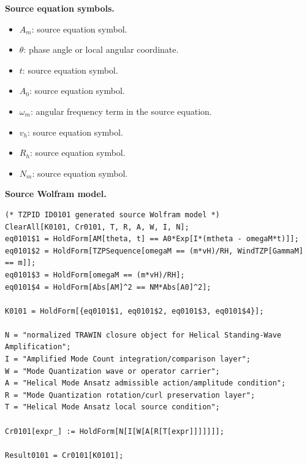 \begin{minipage}[t]{0.49\linewidth}
\begingroup
\small
\raggedright
\textbf{Source equation symbols.}\par
\begin{itemize}[leftmargin=1.35em,itemsep=1pt,topsep=1pt,parsep=0pt]
    \item $A_m$: source equation symbol.
    \item $\theta$: phase angle or local angular coordinate.
    \item $t$: source equation symbol.
    \item $A_0$: source equation symbol.
    \item $\omega_m$: angular frequency term in the source equation.
    \item $v_h$: source equation symbol.
    \item $R_h$: source equation symbol.
    \item $N_m$: source equation symbol.
\end{itemize}
\endgroup
\end{minipage}\hfill
\begin{minipage}[t]{0.47\linewidth}
\begingroup
\scriptsize
\raggedright
\textbf{Source Wolfram model.}\par
\begin{Verbatim}[fontsize=\tiny,breaklines=true,breakanywhere=true]
(* TZPID ID0101 generated source Wolfram model *)
ClearAll[K0101, Cr0101, T, R, A, W, I, N];
eq0101$1 = HoldForm[AM[theta, t] == A0*Exp[I*(mtheta - omegaM*t)]];
eq0101$2 = HoldForm[TZPSequence[omegaM == (m*vH)/RH, WindTZP[GammaM] == m]];
eq0101$3 = HoldForm[omegaM == (m*vH)/RH];
eq0101$4 = HoldForm[Abs[AM]^2 == NM*Abs[A0]^2];

K0101 = HoldForm[{eq0101$1, eq0101$2, eq0101$3, eq0101$4}];

N = "normalized TRAWIN closure object for Helical Standing-Wave Amplification";
I = "Amplified Mode Count integration/comparison layer";
W = "Mode Quantization wave or operator carrier";
A = "Helical Mode Ansatz admissible action/amplitude condition";
R = "Mode Quantization rotation/curl preservation layer";
T = "Helical Mode Ansatz local source condition";

Cr0101[expr_] := HoldForm[N[I[W[A[R[T[expr]]]]]]];

Result0101 = Cr0101[K0101];
\end{Verbatim}
\endgroup
\end{minipage}

